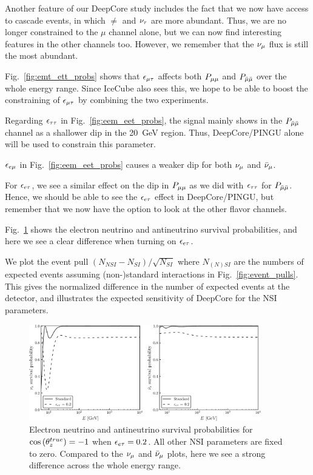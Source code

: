 Another feature of our DeepCore study includes the fact that we now have access to cascade events, in which $\ne$ and $\nu_\tau$ are more abundant. %
Thus, we are no longer constrained to the $\mu$ channel alone, but we can now find interesting features in the other channels too. However, we 
remember that the $\nu_\mu$ flux is still the most abundant. %

Fig.~\ref{fig:emt_ett_probs} shows that $\epsilon_{\mu\tau}$ affects both $P_{\mu\mu}$ and $P_{\bar{\mu} \bar{\mu}}$ over the whole energy range. Since 
IceCube also sees this, we hope to be able to boost the constraining of $\epsilon_{\mu\tau}$ by combining the two experiments.

Regarding $\epsilon_{\tau\tau}$ in Fig.~\ref{fig:eem_eet_probs}, the signal mainly shows in the $P_{\bar{\mu} \bar{\mu}}$ channel as
a shallower dip in the \SI{20}{\GeV} region. Thus, DeepCore/PINGU alone will be used to constrain this parameter.

$\epsilon_{e\mu}$ in Fig.~\ref{fig:eem_eet_probs} causes a weaker dip for both $\nu_\mu$ and $\bar{\nu}_\mu$. 

For $\epsilon_{e\tau}$, we see a similar effect on the dip in $P_{\mu\mu}$ as we did with $\epsilon_{\tau\tau}$ for $P_{\bar{\mu} \bar{\mu}}$. Hence, we should be able to 
see the $\epsilon_{e\tau}$ effect in DeepCore/PINGU, but remember that we now have the option to look at the other flavor channels.

Fig.~\ref{fig:Pee_eet_probs} shows the electron neutrino and antineutrino survival probabilities, and here we see
a clear difference when turning on $\epsilon_{e\tau}$.

We plot the event pull $(N_{NSI} - N_{SI})/\sqrt{N_{SI}}$ where $N_{(N)SI}$ are the numbers of expected events
assuming (non-)standard interactions in Fig.~\ref{fig:event_pulls}. This gives the normalized difference in the
number of expected events at the detector, and illustrates the expected sensitivity of DeepCore for the NSI parameters.
\begin{figure}
    \begin{center}
        \includegraphics[width=0.9\textwidth]{figures/Pee_eet_probs.pdf}
        \caption{Electron neutrino and antineutrino survival probabilities for
        $\cos{(\theta_z^{true})} = -1$ when $\epsilon_{e\tau} = 0.2$. All other NSI parameters are fixed to zero. Compared to the $\nu_\mu$ and $\bar{\nu}_\mu$ plots, here we see a strong difference across the whole energy range.}
        \label{fig:Pee_eet_probs}
    \end{center}
\end{figure}

